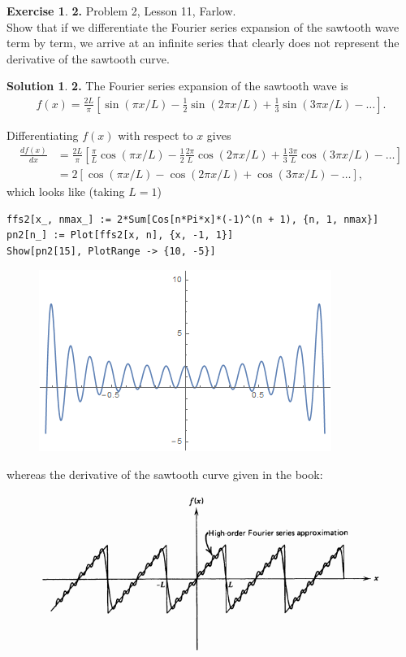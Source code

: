 \documentclass{book}
\theoremstyle{definition}
\newtheorem*{exer*}{Exercise}
\newtheorem*{sln*}{Solution}
\newcommand{\f}[2]{\frac{#1}{#2}}
\newcommand{\lb}{\left[}
\newcommand{\rb}{\right]}
\begin{document}
\begin{exer*}\textbf{2. }Problem 2, Lesson 11, Farlow.\\
	
	Show that if we differentiate the Fourier series expansion of the sawtooth wave term by term, we arrive at an infinite series that clearly does not represent the derivative of the sawtooth curve. 
	
	\begin{sln*}\textbf{2. }
	The Fourier series expansion of the sawtooth wave is
		\begin{align*}
		f(x) = \f{2L}{\pi}\lb \sin(\pi x/L) - \f{1}{2}\sin(2\pi x/L) + \f{1}{3}\sin(3\pi x/L) - \dots \rb.
		\end{align*}
		
	Differentiating $f(x)$ with respect to $x$ gives
	\begin{align*}
	\f{df(x)}{dx} &= \f{2L}{\pi}\lb \f{\pi}{L}\cos(\pi x/L) - \f{1}{2}\f{2\pi}{L}\cos(2\pi x/L) + \f{1}{3}\f{3\pi}{L}\cos(3\pi x/L) - \dots  \rb\\
	&= 2\lb \cos(\pi x/L) - \cos(2\pi x/L) + \cos(3\pi x/L)   - \dots  \rb,
	\end{align*}
	which looks like (taking $L=1$)
	
	\begin{lstlisting}
ffs2[x_, nmax_] := 2*Sum[Cos[n*Pi*x]*(-1)^(n + 1), {n, 1, nmax}]
pn2[n_] := Plot[ffs2[x, n], {x, -1, 1}]
Show[pn2[15], PlotRange -> {10, -5}]
	\end{lstlisting}

	\begin{figure}[h!]
		\centering
		\includegraphics[scale=0.45]{der.png}
	\end{figure}	

	whereas the derivative of the sawtooth curve given in the book:\\
	\begin{figure}[h!]
		\centering
		\includegraphics[scale=0.45]{saw.png}
	\end{figure}
 

\end{sln*}
\end{exer*}
\end{document}
